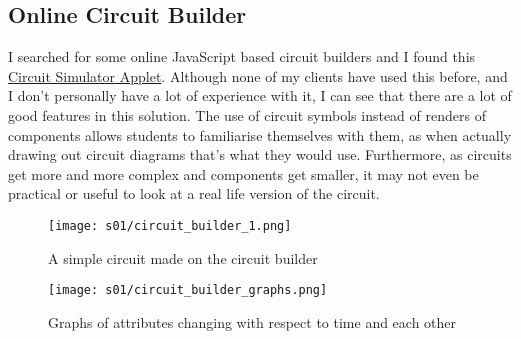 
    \subsection{Online Circuit Builder}
        I searched for some online JavaScript based circuit builders and I found this \href{https://www.falstad.com/circuit/}{Circuit Simulator Applet}. 
        Although none of my clients have used this before, and I don't personally have a lot of experience with it, I can see that there are a lot of good features in this solution. 
        The use of circuit symbols instead of renders of components allows students to familiarise themselves with them, as when actually drawing out circuit diagrams that's what they would use. 
        Furthermore, as circuits get more and more complex and components get smaller, it may not even be practical or useful to look at a real life version of the circuit. 

        \begin{figure}[!ht]
            \centering
            \texttt{[image: s01/circuit\_builder\_1.png]}
            \caption{A simple circuit made on the circuit builder}
            \label{fig:circuit_builder_ss1}
        \end{figure}


        \begin{figure}[!ht]
            \centering
            \texttt{[image: s01/circuit\_builder\_graphs.png]}
            \caption{Graphs of attributes changing with respect to time and each other}
            \label{fig:circuit_builder_ss2}
        \end{figure}


